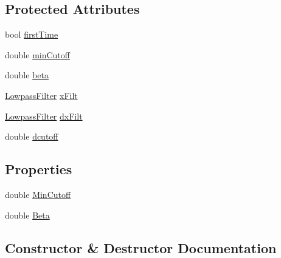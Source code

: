\subsection*{Protected Attributes}
\begin{DoxyCompactItemize}
\item 
bool \hyperlink{class_rowing_monitor_1_1_model_1_1_util_1_1_one_euro_filter_aef4128061f9e58498c536a2f0238fb5e}{first\+Time}
\item 
double \hyperlink{class_rowing_monitor_1_1_model_1_1_util_1_1_one_euro_filter_a54c70fc75d1de35642fc30ef4ef78782}{min\+Cutoff}
\item 
double \hyperlink{class_rowing_monitor_1_1_model_1_1_util_1_1_one_euro_filter_a11b6badcd4065baa9453aa4672300fb3}{beta}
\item 
\hyperlink{class_rowing_monitor_1_1_model_1_1_util_1_1_lowpass_filter}{Lowpass\+Filter} \hyperlink{class_rowing_monitor_1_1_model_1_1_util_1_1_one_euro_filter_a8c5c8ede133408fde40a26fd11f0e9c0}{x\+Filt}
\item 
\hyperlink{class_rowing_monitor_1_1_model_1_1_util_1_1_lowpass_filter}{Lowpass\+Filter} \hyperlink{class_rowing_monitor_1_1_model_1_1_util_1_1_one_euro_filter_ab825015c12eda6bdbe6deaaa69ea44da}{dx\+Filt}
\item 
double \hyperlink{class_rowing_monitor_1_1_model_1_1_util_1_1_one_euro_filter_a6856ece1fd3069d3fda984a17be3f2f4}{dcutoff}
\end{DoxyCompactItemize}
\subsection*{Properties}
\begin{DoxyCompactItemize}
\item 
double \hyperlink{class_rowing_monitor_1_1_model_1_1_util_1_1_one_euro_filter_a65d1767883d487c73e340389d066f097}{Min\+Cutoff}
\item 
double \hyperlink{class_rowing_monitor_1_1_model_1_1_util_1_1_one_euro_filter_a16e8bfe237364453b4ed8d79d05ba662}{Beta}
\end{DoxyCompactItemize}


\subsection{Constructor \& Destructor Documentation}
\mbox{\label{class_rowing_monitor_1_1_model_1_1_util_1_1_one_euro_filter_a945b190ec38aa5a4fd9d440800becda5}} 
